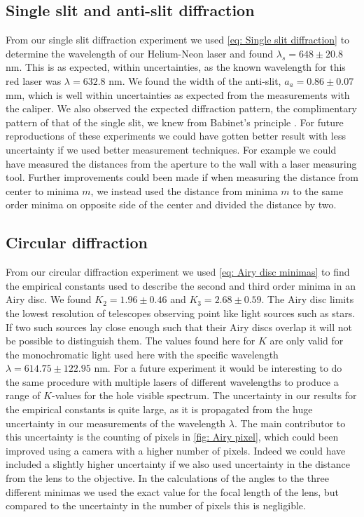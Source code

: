 \documentclass{emulateapj}
\begin{document}
\subsection{Single slit and anti-slit diffraction}
From our single slit diffraction experiment we used \cref{eq: Single slit diffraction} to determine the wavelength of our Helium-Neon laser and found $\lambda_s = 648 \pm 20.8$ nm. This is as expected, within uncertainties, as the known wavelength for this red laser was $\lambda = 632.8$ nm.
We found the width of the anti-slit, $a_a = 0.86 \pm 0.07$ mm, which is well within uncertainties as expected from the measurements with the caliper. We also observed the expected diffraction pattern, the complimentary pattern of that of the single slit, we knew from Babinet's principle \citep{swaves}.
For future reproductions of these experiments we could have gotten better result with less uncertainty if we used better measurement techniques. For example we could have measured the distances from the aperture to the wall with a laser measuring tool. Further improvements could been made if when measuring the distance from center to minima $m$, we instead used the distance from minima $m$ to the same order minima on opposite side of the center and divided the distance by two.

\subsection{Circular diffraction}
From our circular diffraction experiment we used \cref{eq: Airy disc minimas} to find the empirical constants used to describe the second and third order minima in an Airy disc. We found $K_2 = 1.96 \pm 0.46$ and $K_3 = 2.68 \pm 0.59$. The Airy disc limits the lowest resolution of telescopes observing point like light sources such as stars. If two such sources lay close enough such that their Airy discs overlap it will not be possible to distinguish them. The values found here for $K$ are only valid for the monochromatic light used here with the specific wavelength $\lambda = 614.75 \pm 122.95$ nm. For a future experiment it would be interesting to do the same procedure with multiple lasers of different wavelengths to produce a range of $K$-values for the hole visible spectrum.
The uncertainty in our results for the empirical constants is quite large, as it is propagated  from the huge uncertainty in our measurements of the wavelength $\lambda$. The main contributor to this uncertainty is the counting of pixels in \cref{fig: Airy pixel}, which could been improved using a camera with a higher number of pixels. Indeed we could have included a slightly higher uncertainty if we also used uncertainty in the distance from the lens to the objective. In the calculations of the angles to the three different minimas we used the exact value for the focal length of the lens, but compared to the uncertainty in the number of pixels this is negligible.
\end{document}
